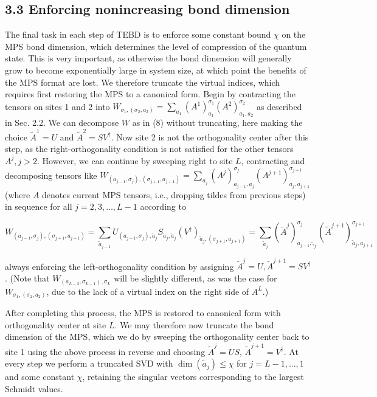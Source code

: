 \documentclass[12pt]{article}
\begin{document}
\subsection*{3.3 Enforcing nonincreasing bond dimension}
The final task in each step of TEBD is to enforce some constant bound $\chi$ on the MPS bond dimension, which determines the level of compression of the quantum state. This is very important, as otherwise the bond dimension will generally grow to become exponentially large in system size, at which point the benefits of the MPS format are lost. We therefore truncate the virtual indices, which requires first restoring the MPS to a canonical form. Begin by contracting the tensors on sites 1 and 2 into $W_{\sigma_{1},\left(\sigma_{2}, a_{2}\right)}=\sum_{a_{1}}\left(A^{1}\right)_{a_{1}}^{\sigma_{1}}\left(A^{2}\right)_{a_{1}, a_{2}}^{\sigma_{2}}$ as described in Sec. 2.2. We can decompose $W$ as in (8) without truncating, here making the choice $\tilde{A}^{1}=U$ and $\tilde{A}^{2}=S V^{\dagger}$. Now site 2 is not the orthogonality center after this step, as the right-orthogonality condition is not satisfied for the other tensors $A^{j}, j>2$. However, we can continue by sweeping right to site $L$, contracting and decomposing tensors like $W_{\left(a_{j-1}, \sigma_{j}\right),\left(\sigma_{j+1}, a_{j+1}\right)}=\sum_{a_{j}}\left(A^{j}\right)_{a_{j-1}, a_{j}}^{\sigma_{j}}\left(A^{j+1}\right)_{a_{j}, a_{j+1}}^{\sigma_{j+1}}$ (where $A$ denotes current MPS tensors, i.e., dropping tildes from previous steps) in sequence for all $j=2,3, \ldots, L-1$ according to


\begin{equation*}
W_{\left(a_{j-1}, \sigma_{j}\right),\left(\sigma_{j+1}, a_{j+1}\right)}=\sum_{\tilde{a}_{j-1}} U_{\left(a_{j-1}, \sigma_{j}\right), \tilde{a}_{j}} S_{\tilde{a}_{j}, \tilde{a}_{j}}\left(V^{\dagger}\right)_{\tilde{a}_{j},\left(\sigma_{j+1}, a_{j+1}\right)}=\sum_{\tilde{a}_{j}}\left(\tilde{A}^{j}\right)_{a_{j-1}, \tilde{,}_{j}}^{\sigma_{j}}\left(\tilde{A}^{j+1}\right)_{\tilde{a}_{j}, a_{j+1}}^{\sigma_{j+1}} \tag{14}
\end{equation*}


always enforcing the left-orthogonality condition by assigning $\tilde{A}^{j}=U, \tilde{A}^{j+1}=S V^{\dagger}$. (Note that $W_{\left(a_{L-2}, \sigma_{L-1}\right), \sigma_{L}}$ will be slightly different, as was the case for $W_{\sigma_{1},\left(\sigma_{2}, a_{2}\right)}$, due to the lack of a virtual index on the right side of $A^{L}$.)

After completing this process, the MPS is restored to canonical form with orthogonality center at site $L$. We may therefore now truncate the bond dimension of the MPS, which we do by sweeping the orthogonality center back to site 1 using the above process in reverse and choosing $\tilde{A}^{j}=U S$, $\tilde{A}^{j+1}=V^{\dagger}$. At every step we perform a truncated SVD with $\operatorname{dim}\left(\tilde{a}_{j}\right) \leq \chi$ for $j=L-1, \ldots, 1$ and some constant $\chi$, retaining the singular vectors corresponding to the largest Schmidt values.
\end{document}
